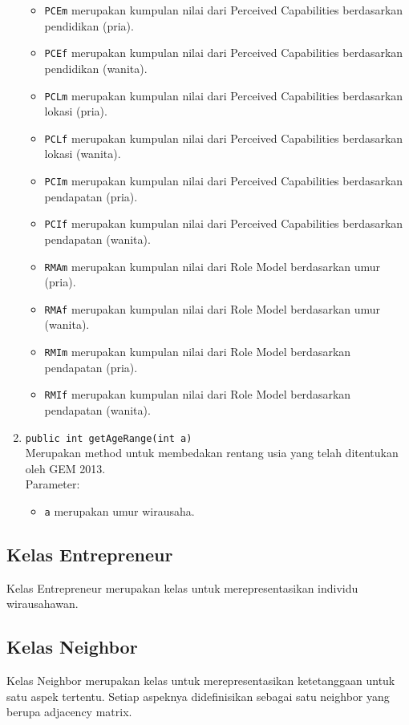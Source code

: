 \begin{enumerate}
\begin{itemize}
				\item \texttt{PCEm} merupakan kumpulan nilai dari Perceived Capabilities berdasarkan pendidikan (pria).
				\item \texttt{PCEf} merupakan kumpulan nilai dari Perceived Capabilities berdasarkan pendidikan (wanita).
				\item \texttt{PCLm} merupakan kumpulan nilai dari Perceived Capabilities berdasarkan lokasi (pria).
				\item \texttt{PCLf} merupakan kumpulan nilai dari Perceived Capabilities berdasarkan lokasi (wanita).
				\item \texttt{PCIm} merupakan kumpulan nilai dari Perceived Capabilities berdasarkan pendapatan (pria).
				\item \texttt{PCIf} merupakan kumpulan nilai dari Perceived Capabilities berdasarkan pendapatan (wanita).
				\item \texttt{RMAm} merupakan kumpulan nilai dari Role Model berdasarkan umur (pria).
				\item \texttt{RMAf} merupakan kumpulan nilai dari Role Model berdasarkan umur (wanita).
				\item \texttt{RMIm} merupakan kumpulan nilai dari Role Model berdasarkan pendapatan (pria).
				\item \texttt{RMIf} merupakan kumpulan nilai dari Role Model berdasarkan pendapatan (wanita).
			\end{itemize}
			
			\item \texttt{public int getAgeRange(int a)}\\
			Merupakan method untuk membedakan rentang usia yang telah ditentukan oleh GEM 2013.\cite{GEM2013}\\
			Parameter:
			\begin{itemize}
				\item \texttt{a} merupakan umur wirausaha.
			\end{itemize}
		\end{enumerate}
		
\subsection{Kelas Entrepreneur} 
	Kelas Entrepreneur merupakan kelas untuk merepresentasikan individu wirausahawan.
\subsection{Kelas Neighbor}
	Kelas Neighbor merupakan kelas untuk merepresentasikan ketetanggaan untuk satu aspek tertentu. Setiap aspeknya didefinisikan sebagai satu neighbor yang berupa adjacency matrix.
